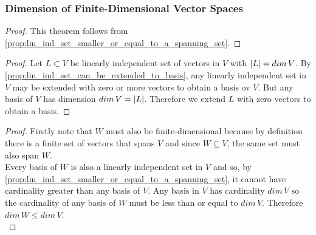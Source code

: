 \documentclass[MathsNotesBase.tex]{subfiles}
\begin{document}
{	\medskip
	\subsubsection{Dimension of Finite-Dimensional Vector Spaces}
	
	\medskip
	\begin{proof}
		This theorem follows from \autoref{prop:lin_ind_set_smaller_or_equal_to_a_spanning_set}.
	\end{proof}

	\medskip
	\begin{proof}
		Let ${ L \subset V }$ be linearly independent set of vectors in $V$ with ${ \left\lvert L\right\rvert = dim\,V }$. By \autoref{prop:lin_ind_set_can_be_extended_to_basis}, any linearly independent set in $V$ may be extended with zero or more vectors to obtain a basis ov $V$. But any basis of $V$ has dimension ${ dim\,V = \left\lvert L\right\rvert }$. Therefore we extend $L$ with zero vectors to obtain a basis.
	\end{proof}


	\medskip
	\begin{proof}
		Firstly note that $W$ must also be finite-dimensional because by definition there is a finite set of vectors that spans $V$ and since ${ W \subseteq V }$, the same set must also span $W$.\\
		Every basis of $W$ is also a linearly independent set in $V$ and so, by \autoref{prop:lin_ind_set_smaller_or_equal_to_a_spanning_set}, it cannot have cardinality greater than any basis of $V$. Any basis in $V$ has cardinality ${ dim\,V }$ so the cardinality of any basis of $W$ must be less than or equal to ${ dim\,V }$. Therefore ${ dim\,W \leq dim\,V }$.\\
		

\end{proof}}
\end{document}
